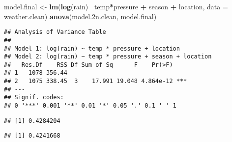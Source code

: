 \documentclass[]{article}
\newenvironment{Shaded}{\begin{snugshade}}{\end{snugshade}}
\newcommand{\DataTypeTok}[1]{\textcolor[rgb]{0.13,0.29,0.53}{#1}}
\newcommand{\FloatTok}[1]{\textcolor[rgb]{0.00,0.00,0.81}{#1}}
\newcommand{\KeywordTok}[1]{\textcolor[rgb]{0.13,0.29,0.53}{\textbf{#1}}}
\newcommand{\NormalTok}[1]{#1}
\newcommand{\OperatorTok}[1]{\textcolor[rgb]{0.81,0.36,0.00}{\textbf{#1}}}
\newcommand{\StringTok}[1]{\textcolor[rgb]{0.31,0.60,0.02}{#1}}
\begin{document}
\begin{Shaded}
\begin{Highlighting}[]
\NormalTok{model.final <-}\StringTok{ }\KeywordTok{lm}\NormalTok{(}\KeywordTok{log}\NormalTok{(rain)}\OperatorTok{~}\StringTok{ }\NormalTok{temp}\OperatorTok{*}\NormalTok{pressure }\OperatorTok{+}\StringTok{ }\NormalTok{season }\OperatorTok{+}\StringTok{ }\NormalTok{location, }\DataTypeTok{data =}\NormalTok{ weather.clean)}
\KeywordTok{anova}\NormalTok{(model}\FloatTok{.2}\NormalTok{n.clean, model.final)}
\end{Highlighting}
\end{Shaded}

\begin{verbatim}
## Analysis of Variance Table
## 
## Model 1: log(rain) ~ temp * pressure + location
## Model 2: log(rain) ~ temp * pressure + season + location
##   Res.Df    RSS Df Sum of Sq      F    Pr(>F)    
## 1   1078 356.44                                  
## 2   1075 338.45  3    17.991 19.048 4.864e-12 ***
## ---
## Signif. codes:  
## 0 '***' 0.001 '**' 0.01 '*' 0.05 '.' 0.1 ' ' 1
\end{verbatim}

\begin{Shaded}
\end{Shaded}

\begin{verbatim}
## [1] 0.4284204
\end{verbatim}

\begin{Shaded}
\end{Shaded}

\begin{verbatim}
## [1] 0.4241668
\end{verbatim}
\end{document}
